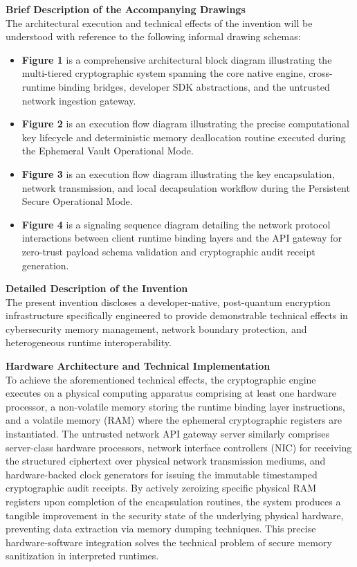 \documentclass[12pt, a4paper]{article}
\begin{document}
\vspace{1em}
\noindent \textbf{Brief Description of the Accompanying Drawings} \\
The architectural execution and technical effects of the invention will be understood with reference to the following informal drawing schemas:
\begin{itemize}
    \item \textbf{Figure 1} is a comprehensive architectural block diagram illustrating the multi-tiered cryptographic system spanning the core native engine, cross-runtime binding bridges, developer SDK abstractions, and the untrusted network ingestion gateway.
    \item \textbf{Figure 2} is an execution flow diagram illustrating the precise computational key lifecycle and deterministic memory deallocation routine executed during the Ephemeral Vault Operational Mode.
    \item \textbf{Figure 3} is an execution flow diagram illustrating the key encapsulation, network transmission, and local decapsulation workflow during the Persistent Secure Operational Mode.
    \item \textbf{Figure 4} is a signaling sequence diagram detailing the network protocol interactions between client runtime binding layers and the API gateway for zero-trust payload schema validation and cryptographic audit receipt generation.
\end{itemize}

\vspace{1em}
\noindent \textbf{Detailed Description of the Invention} \\
The present invention discloses a developer-native, post-quantum encryption infrastructure specifically engineered to provide demonstrable technical effects in cybersecurity memory management, network boundary protection, and heterogeneous runtime interoperability.

\vspace{0.5em}
\noindent \textbf{Hardware Architecture and Technical Implementation} \\
To achieve the aforementioned technical effects, the cryptographic engine executes on a physical computing apparatus comprising at least one hardware processor, a non-volatile memory storing the runtime binding layer instructions, and a volatile memory (RAM) where the ephemeral cryptographic registers are instantiated. The untrusted network API gateway server similarly comprises server-class hardware processors, network interface controllers (NIC) for receiving the structured ciphertext over physical network transmission mediums, and hardware-backed clock generators for issuing the immutable timestamped cryptographic audit receipts. By actively zeroizing specific physical RAM registers upon completion of the encapsulation routines, the system produces a tangible improvement in the security state of the underlying physical hardware, preventing data extraction via memory dumping techniques. This precise hardware-software integration solves the technical problem of secure memory sanitization in interpreted runtimes.
\end{document}
